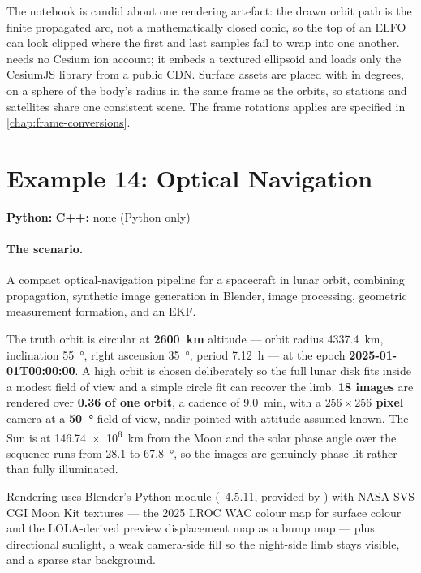 The notebook is candid about one rendering artefact: the drawn orbit path is the
finite propagated arc, not a mathematically closed conic, so the top of an ELFO
can look clipped where the first and last samples fail to wrap into one another.
 needs no Cesium ion account; it embeds a textured
ellipsoid and loads only the CesiumJS library from a public CDN. Surface assets
are placed with  in degrees, on a sphere of
the body's radius in the same frame as the orbits, so stations and satellites
share one consistent scene. The frame rotations  applies are
specified in \cref{chap:frame-conversions}.

\section{Example 14: Optical Navigation}
\label{sec:tut-ex14}

\textbf{Python:}  \quad
\textbf{C++:} none (Python only)

\paragraph{The scenario.}
A compact optical-navigation pipeline for a spacecraft in lunar orbit,
combining \lupnt{} propagation, synthetic image generation in Blender, image
processing, geometric measurement formation, and an EKF.

The truth orbit is circular at \textbf{\SI{2600}{\kilo\meter}} altitude ---
orbit radius \SI{4337.4}{\kilo\meter}, inclination \SI{55}{\degree}, right
ascension \SI{35}{\degree}, period \SI{7.12}{\hour} --- at the epoch
\textbf{2025-01-01T00:00:00}. A high orbit is chosen deliberately so the full
lunar disk fits inside a modest field of view and a simple circle fit can
recover the limb. \textbf{18 images} are rendered over \textbf{0.36 of one
orbit}, a cadence of \SI{9.0}{\minute}, with a \textbf{$256\times256$ pixel}
camera at a \textbf{\SI{50}{\degree}} field of view, nadir-pointed with attitude
assumed known. The Sun is at \SI{146.74e6}{\kilo\meter} from the Moon and the
solar phase angle over the sequence runs from \SI{28.1}{} to \SI{67.8}{\degree},
so the images are genuinely phase-lit rather than fully illuminated.

Rendering uses Blender's Python module (~4.5.11, provided by
) with NASA SVS CGI Moon Kit textures --- the 2025 LROC WAC
colour map for surface colour and the LOLA-derived preview displacement map as a
bump map --- plus directional sunlight, a weak camera-side fill so the night-side
limb stays visible, and a sparse star background.

